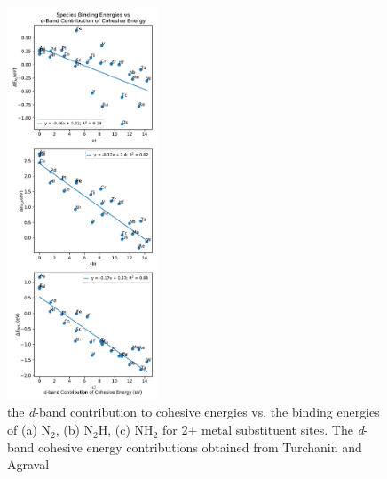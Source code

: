 \begin{figure}
    \centering
    \includegraphics[width=0.4\textwidth]{Images/species_cohesive.pdf}
    \caption{the \textit{d}-band contribution to cohesive energies vs. the binding energies of (a) N$_2$, (b) N$_2$H, (c) NH$_2$ for 2+ metal substituent sites. The \textit{d}-band cohesive energy contributions obtained from Turchanin and Agraval \cite{Turchanin_2008}}
    \label{fig:cohesive}
\end{figure}




